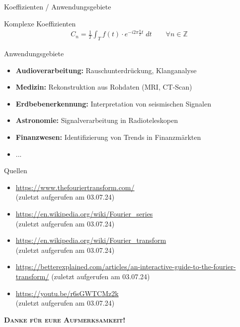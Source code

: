 \documentclass[12pt]{beamer}
\begin{document}
\begin{frame}{Koeffizienten / Anwendungsgebiete}
	\vspace*{-.5cm}
	\begin{block}{Komplexe Koeffizienten}
		\vspace*{-.5cm}
		\begin{align*}
			C_n = \frac{1}{T} \int_T f(t) \cdot e^{-i 2 \pi \frac{n}{T} t} \; dt \quad\quad \forall n \in \mathbb{Z}
		\end{align*}
		\vspace*{-.5cm}
	\end{block}
	
	\pause
	
	\begin{block}{Anwendungsgebiete}
		\begin{itemize}
			\item<2-> \textbf{Audioverarbeitung:} Rauschunterdrückung, Klanganalyse
			\item<3-> \textbf{Medizin:} Rekonstruktion aus Rohdaten (MRI, CT-Scan)
			\item<4-> \textbf{Erdbebenerkennung:} Interpretation von seismischen Signalen
			\item<5-> \textbf{Astronomie:} Signalverarbeitung in Radioteleskopen
			\item<6-> \textbf{Finanzwesen:} Identifizierung von Trends in Finanzmärkten
			\item<7-> ...
		\end{itemize}
	\end{block}
\end{frame}

\begin{frame}{Quellen}
	\begin{itemize}
		\item \url{https://www.thefouriertransform.com/}\\ (zuletzt aufgerufen am 03.07.24)
		
		\item \url{https://en.wikipedia.org/wiki/Fourier_series}\\ (zuletzt aufgerufen am 03.07.24)
		
		\item \url{https://en.wikipedia.org/wiki/Fourier_transform}\\ (zuletzt aufgerufen am 03.07.24)
		
		\item \url{https://betterexplained.com/articles/an-interactive-guide-to-the-fourier-transform/} (zuletzt aufgerufen am 03.07.24)
		
		\item \url{https://youtu.be/r6sGWTCMz2k}\\ (zuletzt aufgerufen am 03.07.24)
	\end{itemize}
	
	\begin{center}
		\textbf{\textsc{Danke für eure Aufmerksamkeit!}}
	\end{center}
\end{frame}
\end{document}
